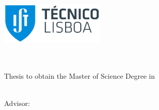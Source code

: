 
\begin{titlepage}
\includegraphics[width=5cm]{images/Logo_IST_color}~\\[2.0cm]
\begin{center}
{\LARGE \textbf{\Title}}\\[1.0cm]
{\Large \textbf{\StudentName}}\\[1.0cm]
{\large Thesis to obtain the Master of Science Degree in}\\[1.0cm]
{\LARGE \textbf{\DegreeName}}\\[1.0cm]

\begin{minipage}[t]{.75\textwidth}
\begin{center}
{\large Advisor:\:}
{\Supervisors}
\end{center}
\end{minipage}\\[1.0cm]




\end{center}
\end{titlepage}
